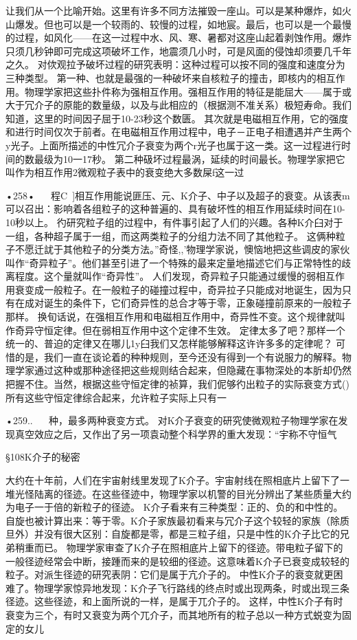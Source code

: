 让我们从一个比喻开始。这里有许多不同方法摧毁一座山。可以是某种爆炸，如火山爆发。但也可以是一个较雨的、较慢的过程，如地宸。最后，也可以是一个最慢的过程，如风化——在这一过程中水、风、寒、暑都对这座山起着剥蚀作用。爆炸只须几秒钟即可完成这项破坏工作，地震须几小时，可是风面的侵蚀却须要几千年之久。
对佽观拉予破坏过程的研究表明：这种过程可以按不同的强度和速度分为三种类型。
第一种、也就是最强的一种破坏来自核粒子的撞击，即核内的相互作用。物理学家把这些扑件称为强相互作用。强相互作用的特征是能屈大——属于或大于冗介子的原能的数量级，以及与此相应的（根据测不准关系）极短寿命。我们知道，这里的时间因子屈于10-23秒这个数匮。
其次就是电磁相互作用，它的强度和进行时间仅次于前者。在电磁相互作用过程中，电子－正电子相遭遇并产生两个y光子。上面所描述的中性冗介子衰变为两个r光子也属于这一类。这一过程进行时间的数最级为10一17秒。
第二种砐坏过程最涡，延续的时间最长。物理学家把它叫作为相互作用2微观粒子表中的衰变绝大多数屎f这一过

•258•
  
程C~]相互作用能说匪压、元、K介子、中子以及超子的衰变。从该表m可以召出：影响着各组粒子的这种普遍的、具有破坏性的相互作用延续时间在10-10秒以上。
彴研究粒子组的过程中，有件事引起了人们的兴趣。各种K介臼对于一组，各种超子属于一组，而这两类粒子的分组力法不同了其他粒子。
这俩种粒子不愿迁訧于其他粒子的分类方法。”奇怪,,'物理学家说，懊恼地把这些调皮的家伙叫作“奇异粒子”。他们甚至引进了一个特殊的最来定量地描述它们与正常特性的歧离程度。这个量就叫作“奇异性”。
人们发现，奇异粒子只能通过缓慢的弱相互作用衰变成一般粒子。在一般粒子的碰撞过程中，奇异拉子只能成对地诞生，因为只有在成对诞生的条件下，它们奇异性的总合才等于零，正象碰撞前原来的一般粒子那样。
换旬话说，在强相互作用和电磁相互作用中，奇异性不变。这个规律就叫作奇异守恒定律。但在弱相互作用中这个定律不生效。
定律太多了吧？那样一个统一的、普迫的定律又在哪儿1y臼我们又怎样能够解释这许许多多的定律呢？
可惜的是，我们一直在谈论着的种种规则，至今还没有得到一个有说服力的解释。物理学家通过这种或那种途径把这些规则结合起来，但隐藏在事物深处的本肵却仍然把握不住。当然，根据这些守恒定律的祯算，我们伲够彴出粒子的实际衰变方式()所有这些守恒定律综合起来，允许粒子实际上只有一

•259..
  
种，最多两种衰变方式。
对K介子衰变的研究使微观粒子物理学家在发现真空效应之后，又作出了另一项袁动整个科学界的重大发现：“宇称不守恒气

§108K介子的秘密

大约在十年前，人们在宇宙射线里发现了K介子。宇宙射线在照相底片上留下了一堆光怪陆离的径迹。在这些径迹中，物理学家以机警的目光分辨出了某些质量大约为电子一于倍的新粒子的径迹。
K介子看来有三种类型：正的、负的和中性的。自旋也被计算出来：等于零。K介子家族最初看来与冗介子这个较轻的家族（除质旦外）并没有很大区别：自旋都是零，都是三粒子组，只是中性的K介子比它的兄弟稍重而已。
物理学家审查了K介子在照相底片上留下的径迹。带电粒子留下的一般径迹经常会中断，接踵而来的是较细的径迹。这意味着K介子已衰变成较轻的粒子。对派生径迹的研究表阴：它们是属于亢介子的。
中性K介子的衰变就更困难了。物理学家惊异地发现：K介子飞行路线的终点时或出现两条，时或出现三条径迹。这些径迹，和上面所说的一样，是属于兀介子的。
这样，中性K介子有时衰变为三个，有时又衰变为两个兀介子，而其地所有的粒子总以一种方式蜕变为固定的女儿

